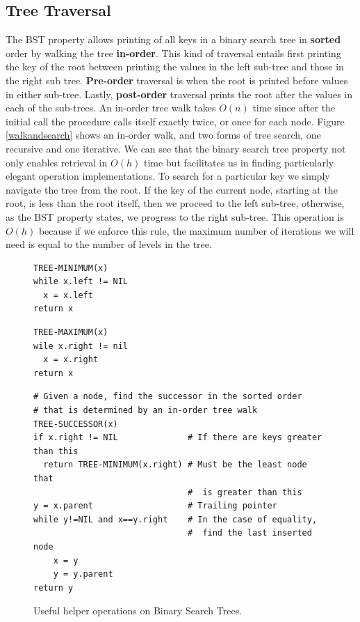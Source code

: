 \documentclass[10pt,a4paper]{article}
\begin{document}
\subsection{Tree Traversal}
The BST property allows printing of all keys in a binary search tree in {\bf sorted} order by walking the tree {\bf in-order}. This kind of traversal entails first printing the key of the root between printing the values in the left sub-tree and those in the right sub tree. {\bf Pre-order} traversal is when the root is printed before values in either sub-tree. Lastly, {\bf post-order} traversal prints the root after the values in each of the sub-trees. An in-order tree walk takes $O(n)$ time since after the initial call the procedure calls itself exactly twice, or once for each node. 
\newline\newline
Figure \ref{walkandsearch} shows an in-order walk, and two forms of tree search, one recursive and one iterative. We can see that the binary search tree property not only enables retrieval in $O(h)$ time but facilitates us in finding particularly elegant operation implementations. To search for a particular key we simply navigate the tree from the root. If the key of the current node, starting at the root, is less than the root itself, then we proceed to the left sub-tree, otherwise, as the BST property states, we progress to the right sub-tree. This operation is $O(h)$ because if we enforce this rule, the maximum number of iterations we will need is equal to the number of levels in the tree.  


\begin{figure}
\caption{Useful helper operations on Binary Search Trees.}
\begin{center}
\begin{lstlisting}
TREE-MINIMUM(x)
while x.left != NIL
  x = x.left
return x
\end{lstlisting}

\begin{lstlisting}
TREE-MAXIMUM(x)
wile x.right != nil
  x = x.right
return x
\end{lstlisting}

\begin{lstlisting}
# Given a node, find the successor in the sorted order
# that is determined by an in-order tree walk
TREE-SUCCESSOR(x)
if x.right != NIL			   # If there are keys greater than this
  return TREE-MINIMUM(x.right) # Must be the least node that
  							   #  is greater than this
y = x.parent				   # Trailing pointer 
while y!=NIL and x==y.right	   # In the case of equality,
							   #  find the last inserted node 
	x = y
	y = y.parent
return y
\end{lstlisting}
\label{helperbst}
\end{center}
\end{figure}
\end{document}
